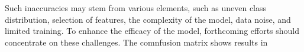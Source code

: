 \documentclass{article}
\begin{document}
\begin{multicols}{2}
Such inaccuracies may stem from various elements, such as uneven class distribution, selection of features, the complexity of the model, data noise, and limited training. To enhance the efficacy of the model, forthcoming efforts should concentrate on these challenges.
The comnfusion matrix shows results in  
\end{multicols}
\end{document}
